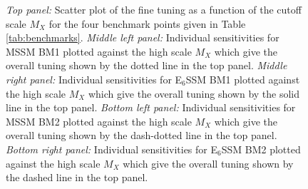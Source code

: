 \documentclass[preprint,amsmath,amssymb,aps,superscriptaddress,prd,
showpacs,floatfix,nofootinbib]{revtex4-1}
\begin{document}
\begin{figure}
\begin{center}
\caption{\textit{Top panel:} Scatter plot of the fine tuning as a function
of the cutoff scale $M_X$ for the four benchmark points given in
Table \ref{tab:benchmarks}.  \textit{Middle left panel:}  Individual
sensitivities for MSSM BM1 plotted against the high scale $M_X$ which give
the overall tuning shown by the dotted line in the top panel.
\textit{Middle right panel:} Individual sensitivities for E$_6$SSM BM1 plotted
against the high scale $M_X$ which give the overall tuning shown by the solid
line in the top panel.  \textit{Bottom left panel:} Individual sensitivities
for MSSM BM2 plotted against the high scale $M_X$ which give the overall
tuning shown by the dash-dotted line in the top panel.
\textit{Bottom right panel:} Individual sensitivities for E$_6$SSM BM2 plotted
against the high scale $M_X$ which give the overall tuning shown by the dashed
line in the top panel.}
\label{Fig:BMs-varyMX}
\end{center}
\end{figure}
\end{document}
